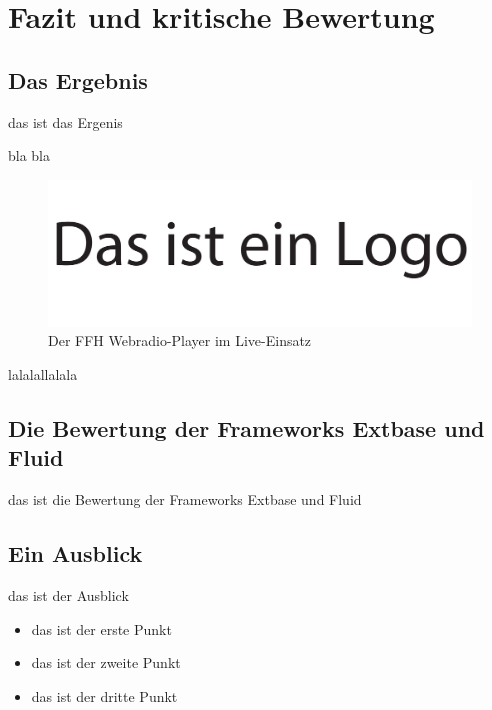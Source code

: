 \chapter{Fazit und kritische Bewertung}
\label{cha:Fazit}

\section{Das Ergebnis}
\label{sec:Ergebnis}
das ist das Ergenis 

bla bla 

\begin{figure}[htbp]
	\begin{center}
		\includegraphics[width=\textwidth]{Bilder/Logo.pdf}
		\caption[FFH Webradio-Player im Live-Einsatz]{Der FFH Webradio-Player im Live-Einsatz}
		\label{fig:FfhWebradioEndversion}
	\end{center}
\end{figure}

lalalallalala

\newpage

\section{Die Bewertung der Frameworks Extbase und Fluid}
\label{sec:BewertungFrameworks}

das ist die Bewertung der Frameworks Extbase und Fluid

\section{Ein Ausblick}
\label{sec:EinAusblick}

das ist der Ausblick
\begin{itemize}
	\item das ist der erste Punkt
	\item das ist der zweite Punkt
	\item das ist der dritte Punkt
\end{itemize}